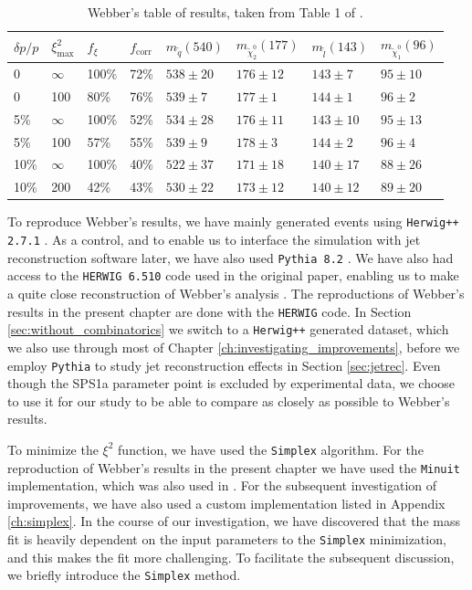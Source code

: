 \documentclass[twoside,english]{uiofysmaster}
\begin{document}
\begin{table}[hbt]
	\centering
	\begin{tabular}{| l | l | l | l  || l | l | l | l |}
		\hline
		$\delta p/p$ & $\xi^2_\mathrm{max}$ & $f_\xi$ & $f_\mathrm{corr}$ & $m_{\tilde q} (540)$ & $m_{\tilde \chi_2^0} (177)$ & $m_{\tilde l} (143)$ & $m_{\tilde \chi_1^0} (96)$ \\
		\hline \hline
		0 & 	$\infty$ &	100\%	& 72\%	& $538 \pm 20$	&	$176 \pm 12$	&	$143 \pm 7$	& 	$95 \pm 10$	\\
		0 &		100 &		80\%	& 76\% & $539 \pm 7$	&	$177 \pm 1$		&	$144 \pm 1$	&	$96 \pm 2$	\\
		5\% &	$\infty$ &	100\%	& 52\% & $534 \pm 28$	& 	$176 \pm 11$	&	$143 \pm 10$&	$95 \pm 13$ \\
		5\% &	100 &		57\%	& 55\% & $539 \pm 9$	&	$178 \pm 3$		& 	$144 \pm 2$	&	$96 \pm 4$	\\
		10\% &	$\infty$ &	100\%	& 40\% & $522 \pm 37$	&	$171 \pm 18$	&	$140 \pm 17$&	$88 \pm 26$	\\
		10\% &	200 &		42\%	& 43\% & $530 \pm 22$	& 	$173 \pm 12$	&	$140 \pm 12$&	$89 \pm 20$ \\
		\hline
	\end{tabular}
	\caption{Webber's table of results, taken from Table 1 of \cite{Webber:2009vm}.}
	\label{table:webber_original}
\end{table}

To reproduce Webber's results, we have mainly generated events using {\tt Herwig++ 2.7.1} \cite{Bahr:2008pv}. As a control, and to enable us to interface the simulation with jet reconstruction software later, we have also used {\tt Pythia 8.2} \cite{Sjostrand:2014zea}. We have also had access to the {\tt HERWIG 6.510} code used in the original paper, enabling us to make a quite close reconstruction of Webber's analysis \cite{Webber:epost}. The reproductions of Webber's results in the present chapter are done with the {\tt HERWIG} code. In Section \ref{sec:without_combinatorics} we switch to a {\tt Herwig++} generated dataset, which we also use through most of Chapter \ref{ch:investigating_improvements}, before we employ {\tt Pythia} to study jet reconstruction effects in Section \ref{sec:jetrec}. Even though the SPS1a parameter point is excluded by experimental data, we choose to use it for our study to be able to compare as closely as possible to Webber's results.

To minimize the $\xi^2$ function, we have used the {\tt Simplex} algorithm. For the reproduction of Webber's results in the present chapter we have used the {\tt Minuit} implementation, which was also used in \cite{Webber:2009vm}. For the subsequent investigation of improvements, we have also used a custom implementation listed in Appendix \ref{ch:simplex}. In the course of our investigation, we have discovered that the mass fit is heavily dependent on the input parameters to the {\tt Simplex} minimization, and this makes the fit more challenging. To facilitate the subsequent discussion, we briefly introduce the {\tt Simplex} method.
\end{document}
